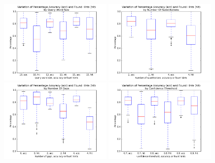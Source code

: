 \documentclass{article}
\begin{document}
\begin{figure}[tbp]
\begin{center}
\caption{}
   \includegraphics[width=0.49\textwidth]{size}
   \includegraphics[width=0.49\textwidth]{diff}
   \includegraphics[width=0.49\textwidth]{gap}
   \includegraphics[width=0.49\textwidth]{conf}
\label{figure:box_plots}
\end{center}
\end{figure}
\end{document}
